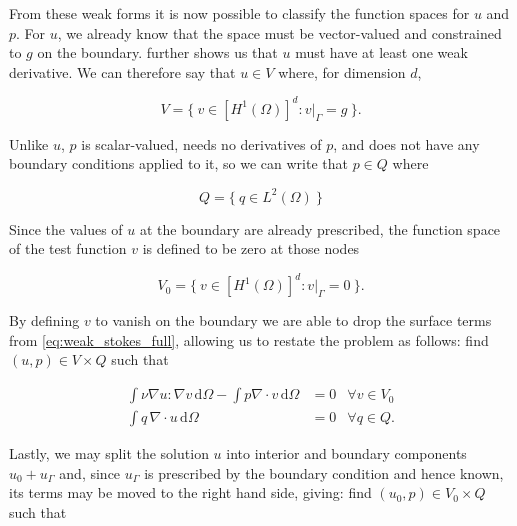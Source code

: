 \documentclass[thesis]{subfiles}
\begin{document}
From these weak forms it is now possible to classify the function spaces for $u$ and $p$.
For $u$, we already know that the space must be vector-valued and constrained to $g$ on the boundary.
 further shows us that $u$ must have at least one weak derivative.
We can therefore say that $u \in V$ where, for dimension $d$,

\begin{equation}
  V = \{ \ v \in [H^1(\Omega)]^d : v |_{\Gamma} = g \ \}.
  \label{eq:stokes_velocity_space}
\end{equation}

Unlike $u$, $p$ is scalar-valued, needs no derivatives of $p$, and does not have any boundary conditions applied to it, so we can write that $p \in Q$ where

\begin{equation}
  Q = \{ \ q \in L^2(\Omega) \ \}
  \label{eq:stokes_pressure_space}
\end{equation}

Since the values of $u$ at the boundary are already prescribed, the function space of the test function $v$ is defined to be zero at those nodes

\begin{equation}
  V_0 = \{\ v \in [H^1(\Omega)]^d : v|_{\Gamma} = 0 \ \}.
\end{equation}

By defining $v$ to vanish on the boundary we are able to drop the surface terms from \cref{eq:weak_stokes_full}, allowing us to restate the problem as follows: find $(u, p) \in V \times Q$ such that

\begin{equation*}
  \begin{aligned}
    \int \nu \nabla u : \nabla v \, \textrm{d}\Omega
    - \int p \nabla \cdot v \, \textrm{d}\Omega
    &= 0
    &\forall v \in V_0 \\
    \int q \, \nabla \cdot u \, \textrm{d}\Omega
    &= 0
    &\forall q \in Q.
  \end{aligned}
\end{equation*}


Lastly, we may split the solution $u$ into interior and boundary components $u_0 + u_\Gamma$ and, since $u_\Gamma$ is prescribed by the boundary condition and hence known, its terms may be moved to the right hand side, giving: find $(u_0, p) \in V_0 \times Q$ such that
\end{document}
